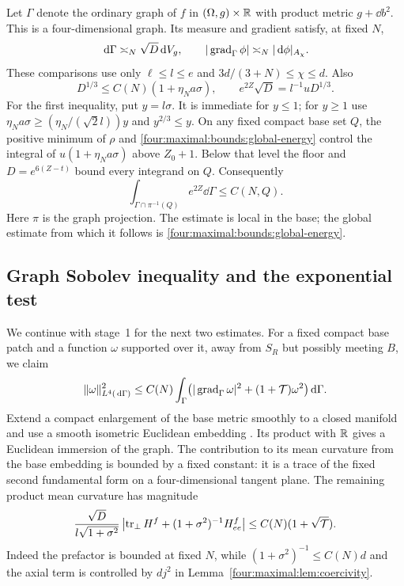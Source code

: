 Let $\Gamma$ denote the ordinary graph of $f$ in $(\Omega,g)\times\mathbb R$
with product metric $g+\dd b^2$. This is a four-dimensional graph.
Its measure and gradient satisfy, at fixed $N$,
\begin{equation}\label{four:maximal:bounds:graph-comparison}
 \,\mathrm d\Gamma\asymp_N\sqrt D\,\mathrm d V_g,\qquad
 |\operatorname{grad}_\Gamma\phi|\asymp_N|\,\mathrm d\phi|_{A_\chi}.
\end{equation}
These comparisons use only $\ell\le l\le e$ and
$3d/(3+N)\le\chi\le d$. Also
\[
 D^{1/3}\le C(N)(1+\eta_N a\sigma),\qquad
 e^{2Z}\sqrt D=l^{-1}uD^{1/3}.
\]
For the first inequality, put $y=l\sigma$. It is immediate for
$y\le1$; for $y\ge1$ use
$\eta_N a\sigma\ge(\eta_N/(\sqrt2 l))y$ and $y^{2/3}\le y$.
On any fixed compact base set $Q$, the positive minimum of $\rho$
and \eqref{four:maximal:bounds:global-energy} control the integral of
$u(1+\eta_N a\sigma)$ above $Z_0+1$. Below that level the floor and
$D=e^{6(Z-t)}$ bound every integrand on $Q$. Consequently
\begin{equation}\label{four:maximal:bounds:graph-l2}
 \int_{\Gamma\cap\pi^{-1}(Q)} e^{2Z}\dd\Gamma\le C(N,Q).
\end{equation}
Here $\pi$ is the graph projection. The estimate is local in the base;
the global estimate from which it follows is
\eqref{four:maximal:bounds:global-energy}.

\subsection{Graph Sobolev inequality and the exponential test}

We continue with stage~1 for the next two estimates.
For a fixed compact base patch and a function $\omega$ supported over
it, away from $S_R$ but possibly meeting $B$, we claim
\begin{equation}\label{four:maximal:bounds:graph-sobolev}
 \|\omega\|_{L^4(\,\mathrm d\Gamma)}^2
 \le C(N)\int_\Gamma
       \bigl(|\operatorname{grad}_\Gamma\omega|^2+(1+\mathcal T)\omega^2\bigr)\,\mathrm d\Gamma.
\end{equation}
Extend a compact enlargement of the base metric smoothly to a closed
manifold and use a smooth isometric Euclidean embedding
\cite[Theorem~2, p.~59]{Nash1956}. Its product with $\mathbb R$ gives a Euclidean
immersion of the graph. The contribution to its mean curvature from
the base embedding is bounded by a fixed constant: it is a trace of
the fixed second fundamental form on a four-dimensional tangent
plane. The remaining product mean curvature has magnitude
\[
 \frac{\sqrt D}{l\sqrt{1+\sigma^2}}
 \left|\operatorname{tr}_\perp H^f+(1+\sigma^2)^{-1}H^f_{ee}\right|
 \le C(N)(1+\sqrt{\mathcal T}).
\]
Indeed the prefactor is bounded at fixed $N$, while
$(1+\sigma^2)^{-1}\le C(N)d$ and the axial term is controlled by
$d j^2$ in Lemma~\ref{four:maximal:lem:coercivity}.

